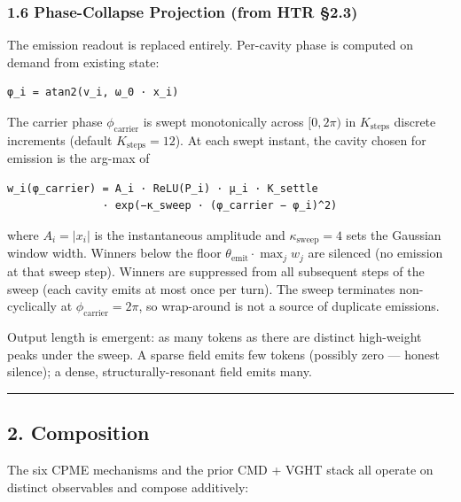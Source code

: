 \documentclass[
  11pt,
  a4paper,
]{article}
\begin{document}
\subsubsection{1.6 Phase-Collapse Projection (from HTR
§2.3)}\label{phase-collapse-projection-from-htr-2.3}

The emission readout is replaced entirely. Per-cavity phase is computed
on demand from existing state:

\begin{verbatim}
φ_i = atan2(v_i, ω_0 · x_i)
\end{verbatim}

The carrier phase \(\phi_{\text{carrier}}\) is swept monotonically
across \([0, 2\pi)\) in \(K_{\text{steps}}\) discrete increments
(default \(K_{\text{steps}} = 12\)). At each swept instant, the cavity
chosen for emission is the arg-max of

\begin{verbatim}
w_i(φ_carrier) = A_i · ReLU(P_i) · μ_i · K_settle
               · exp(−κ_sweep · (φ_carrier − φ_i)^2)
\end{verbatim}

where \(A_i = |x_i|\) is the instantaneous amplitude and
\(\kappa_{\text{sweep}} = 4\) sets the Gaussian window width. Winners
below the floor \(\theta_{\text{emit}} \cdot \max_j w_j\) are silenced
(no emission at that sweep step). Winners are suppressed from all
subsequent steps of the sweep (each cavity emits at most once per turn).
The sweep terminates non-cyclically at \(\phi_{\text{carrier}} = 2\pi\),
so wrap-around is not a source of duplicate emissions.

Output length is emergent: as many tokens as there are distinct
high-weight peaks under the sweep. A sparse field emits few tokens
(possibly zero --- honest silence); a dense, structurally-resonant field
emits many.

\begin{center}\rule{0.5\linewidth}{0.5pt}\end{center}

\subsection{2. Composition}\label{composition}

The six CPME mechanisms and the prior CMD + VGHT stack all operate on
distinct observables and compose additively:
\end{document}
